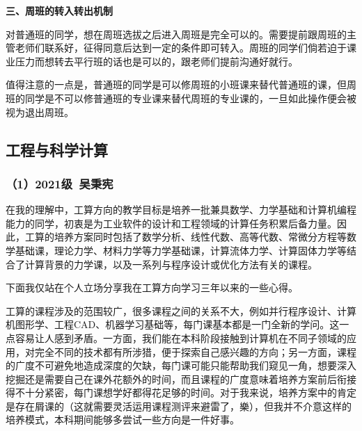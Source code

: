 \documentclass[11pt,oneside]{book}
\begin{document}
\textbf{\textbf{三、周班的转入转出机制}}

对普通班的同学，想在周班选拔之后进入周班是完全可以的。需要提前跟周班的主管老师们联系好，征得同意后达到一定的条件即可转入。周班的同学们倘若迫于课业压力而想转去平行班的话也是可以的，跟老师们提前沟通好就行。

值得注意的一点是，普通班的同学是可以修周班的小班课来替代普通班的课，但周班的同学是不可以修普通班的专业课来替代周班的专业课的，一旦如此操作便会被视为退出周班。


\subsection{工程与科学计算}
\subsubsection{（1）2021级\ 吴秉宪}
            
在我的理解中，工算方向的教学目标是培养一批兼具数学、力学基础和计算机编程能力的同学，初衷是为工业软件的设计和工程领域的计算任务积累后备力量。因此，工算的培养方案同时包括了数学分析、线性代数、高等代数、常微分方程等数学基础课，理论力学、材料力学等力学基础课，计算流体力学、计算固体力学等结合了计算背景的力学课，以及一系列与程序设计或优化方法有关的课程。

下面我仅站在个人立场分享我在工算方向学习三年以来的一些心得。

工算的课程涉及的范围较广，很多课程之间的关系不大，例如并行程序设计、计算机图形学、工程CAD、机器学习基础等，每门课基本都是一门全新的学问。这一点容易让人感到矛盾。一方面，我们能在本科阶段接触到计算机在不同子领域的应用，对完全不同的技术都有所涉猎，便于探索自己感兴趣的方向；另一方面，课程的广度不可避免地造成深度的欠缺，每门课可能只能帮助我们窥见一角，想要深入挖掘还是需要自己在课外花额外的时间，而且课程的广度意味着培养方案前后衔接得不十分紧密，每门课想学好都得花足够的时间。对于我来说，培养方案中的肯定是存在屑课的（这就需要灵活运用课程测评来避雷了，樂），但我并不介意这样的培养模式，本科期间能够多尝试一些方向是一件好事。
\end{document}
